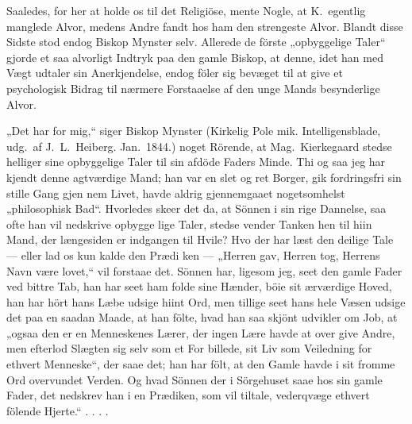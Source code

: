 \documentclass[12pt,a4paper]{article}
\newcommand{\opage}[1]{\marginnote{\footnotesize\textit{[#1]}}}
\begin{document}
Saaledes, for her at holde os til det Religiöse, mente
Nogle, at K.\ egentlig manglede Alvor, medens Andre
fandt hos ham den strengeste Alvor. Blandt disse Sidste
stod endog Biskop Mynster selv. Allerede de förste
„opbyggelige Taler“ gjorde et saa alvorligt Indtryk paa
den gamle Biskop, at denne, idet han med Vægt udtaler
sin Anerkjendelse, endog föler sig bevæget til at give et
psychologisk Bidrag til nærmere Forstaaelse af den unge
Mands besynderlige Alvor.

„Det har for mig,“ siger Biskop Mynster (Kirkelig Pole\-%
mik. Intelligensblade, udg.\ af J.\ L.\ Heiberg. Jan.\ 1844.)
noget Rörende, at Mag.\ Kierkegaard stedse helliger sine
opbyggelige Taler til sin afdöde Faders Minde. Thi og\-%
saa jeg har kjendt denne agtværdige Mand; han var en
slet og ret Borger, gik fordringsfri sin stille Gang gjen\-%
nem Livet, havde aldrig gjennemgaaet nogetsomhelst
„philosophisk Bad“. Hvorledes skeer det da, at Sönnen
i sin rige Dannelse, saa ofte han vil nedskrive opbygge\-%
lige Taler, stedse vender Tanken hen til hiin Mand, der
længesiden er indgangen til Hvile? Hvo der har læst
den deilige Tale --- eller lad os kun kalde den Prædi\-%
ken --- „Herren gav, Herren tog, Herrens Navn være
lovet,“ vil forstaae det. Sönnen har, ligesom jeg, seet
den gamle Fader ved bittre Tab, han har seet ham folde
sine Hænder, böie sit ærværdige Hoved, han har hört
hans Læbe udsige hiint Ord, men tillige seet hans hele
Væsen udsige det paa en saadan Maade, at han fölte,
hvad han saa skjönt udvikler om Job, at „ogsaa den er
en Menneskenes Lærer, der ingen Lære havde at over\-%
give Andre, men efterlod Slægten sig selv som et For\-%
\opage{6}%
billede, sit Liv som Veiledning for ethvert Menneske“,
der saae det; han har fölt, at den Gamle havde i sit
fromme Ord overvundet Verden. Og hvad Sönnen der
i Sörgehuset saae hos sin gamle Fader, det nedskrev han
i en Prædiken, som vil tiltale, vederqvæge ethvert fölende
Hjerte.“ . . . .
\end{document}
